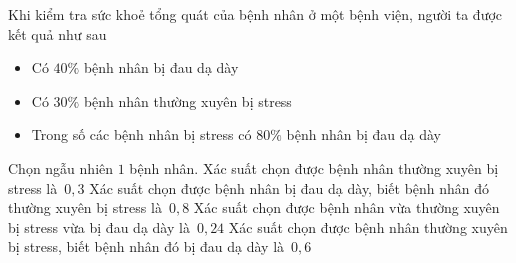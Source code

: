 \begin{ex}%
	Khi kiểm tra sức khoẻ tổng quát của bệnh nhân  ở một bệnh viện, người ta được kết quả như sau
	\begin{itemize}
		\item Có $40\%$ bệnh nhân bị đau  dạ dày
		\item Có $30\%$ bệnh  nhân thường xuyên bị stress
		\item Trong số các bệnh nhân bị stress có $80\%$ bệnh nhân  bị đau dạ dày
	\end{itemize}
	Chọn ngẫu  nhiên $1$ bệnh nhân.
	\choiceTF 
		{\True Xác suất chọn được bệnh nhân thường xuyên  bị stress là~$0{,}3$}
		{\True Xác suất chọn được bệnh nhân bị đau dạ dày, biết bệnh nhân đó thường xuyên bị stress  là~$0{,}8$}
		{\True Xác suất chọn được bệnh nhân vừa thường xuyên bị  stress vừa bị đau dạ dày là~$0{,}24$}
		{\True Xác  suất chọn được bệnh nhân thường xuyên bị stress, biết bệnh nhân đó bị đau dạ dày là~$0{,}6$}
\end{ex}

